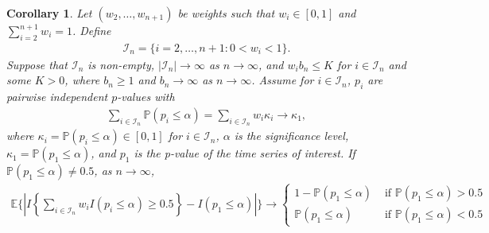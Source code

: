 \documentclass[11pt]{article}
\def\mc#1{\mathcal{#1}} %
\def\E{\mathbb{E}} %
\def\mc#1{\mathcal{#1}}
\def\P{\mathbb{P}}
\newtheorem{corollary}{Corollary}
\theoremstyle{definition}
\begin{document}
\begin{corollary}
\label{coro1}Let $(w_2, \ldots, w_{n+1})$ be weights such that $w_i \in [0,1]$ and $\sum_{i=2}^{n+1} w_i=1$. Define
\begin{align*}
  \mc{I}_n = \{i =  2,\ldots, n+1\colon 0< w_i < 1\}.
\end{align*}
Suppose that  $\mc{I}_n$  is non-empty, $|\mc{I}_n| \to \infty$ as $n \to \infty$, and $w_i b_n\leq K$ for $i\in \mc{I}_n$ and some $K>0$, where $b_n \geq 1$ and $b_n \to \infty$ as $n\to \infty$. Assume for $i \in \mc{I}_n$,  $p_i$ are pairwise independent $p$-values  with 
\begin{align*}
  \sum_{i\in \mc{I}_n}\P(p_i \leq \alpha) = \sum_{i\in \mc{I}_n} w_i \kappa_i \to \kappa_{1},
\end{align*}
where $\kappa_i =  \P(p_i \leq \alpha)\in [0,1]$ for $i \in \mc{I}_n$, $\alpha$ is the significance level, $\kappa_1 = \P(p_1 \leq \alpha)$, and  $p_1$ is the p-value of the time series of interest. If $\P(p_1 \leq \alpha) \neq 0.5$, as $n\to \infty$, 
\begin{align*}
  \E \bigg\{\left|I\left\{ \sum_{i\in \mc{I}_n} w_i I(p_i \leq  \alpha) \geq 0.5\right\}
  - I( p_1 \leq  \alpha) \right|\bigg\}
  \to  \begin{cases}
    1- \P(p_1 \leq \alpha) & \text{ if } \P(p_1 \leq \alpha) > 0.5 \\
    \P(p_1 \leq \alpha) & \text{ if } \P(p_1 \leq \alpha) < 0.5 
  \end{cases}
\end{align*}
\end{corollary}
\end{document}

